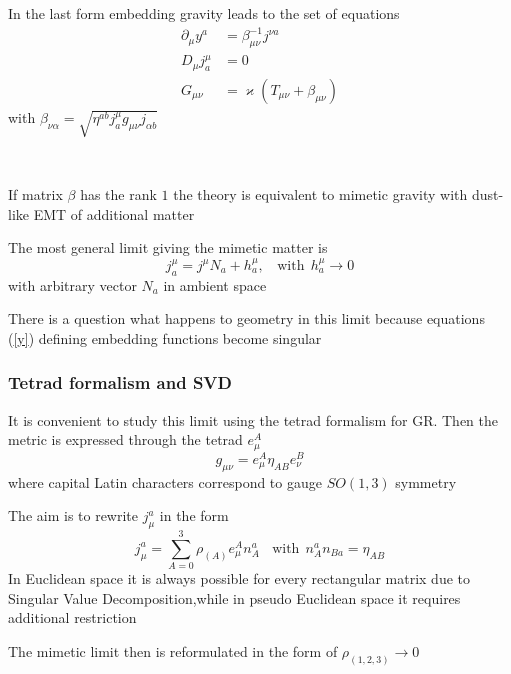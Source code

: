 \documentclass[serif,professionalfonts]{beamer}
\begin{document}
\begin{frame}	
In the last form embedding gravity leads to the set of equations
\begin{align}
\label{y}	\partial_{\mu} y^a &= \beta^{-1}_{\mu \nu} j^{\nu a} \\
	D_{\mu} j^{\mu}_{a} &= 0 \\
	G_{\mu \nu} &= \varkappa \left( T_{\mu \nu} + \beta_{\mu \nu} \right) 
\end{align}
with $\beta_{\nu \alpha} = \sqrt{\eta^{ab}j^{\mu}_{a} g_{\mu \nu} j_{\alpha b}}$

\

If matrix $\beta$ has the rank $1$ the theory is equivalent to mimetic gravity with dust-like
EMT of additional matter

The most general limit giving the mimetic matter is
\begin{equation}
	j^{\mu}_a = j^{\mu} N_a + h^{\mu}_a, \ \ \ \ \text{with} \ \ h^{\mu}_a \to 0 
\end{equation}
with arbitrary vector $N_a$ in ambient space

There is a question what happens to geometry in this limit because equations (\ref{y}) defining embedding functions become singular
\end{frame}

\begin{frame}
\frametitle{Tetrad formalism and SVD}
It is convenient to study this limit using the tetrad formalism for GR. Then the metric is expressed through the tetrad $e_{\mu}^A$
\begin{equation}
	g_{\mu \nu} = e_{\mu}^A \eta_{AB} e_{\nu}^B
\end{equation}
where capital Latin characters correspond to gauge $SO(1,3)$ symmetry

The aim is to rewrite $j_{\mu}^a$ in the form
\begin{equation}
\label{j}
	j_{\mu}^a = \sum \limits_{A=0}^{3} \rho_{(A)} e_{\mu}^A n_A^a \ \ \ \ \text{with} \ \ n_A^a n_{Ba} = \eta_{AB}
\end{equation}
In Euclidean space it is always possible for every rectangular matrix due to Singular Value Decomposition,while in pseudo Euclidean space it requires additional restriction  

The mimetic limit then is reformulated in the form of $\rho_{(1,2,3)} \to 0$
\end{frame}
\end{document}
